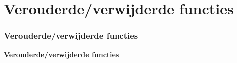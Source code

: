 %

\section{Verouderde/verwijderde functies}
\begin{frame}[fragile]
	\frametitle{Verouderde/verwijderde functies}

	\begin{center}\huge{\color{typo3darkgrey}\textbf{Verouderde/verwijderde functies}}\end{center}
	\begin{center}\large{\textit{}}\end{center}

\end{frame}


